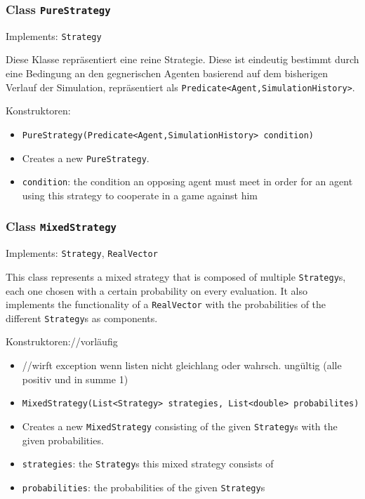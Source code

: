 \documentclass[parskip=full,11pt]{scrartcl}
\begin{document}
\subsubsection{Class \texttt{PureStrategy}}
Implements: \texttt{Strategy}

Diese Klasse repräsentiert eine reine Strategie. Diese ist eindeutig bestimmt durch eine Bedingung an den gegnerischen Agenten basierend auf dem bisherigen Verlauf der Simulation, repräsentiert als \texttt{Predicate<Agent,SimulationHistory>}.

Konstruktoren:
\begin{itemize}\itemsep -10pt
\item \texttt{PureStrategy(Predicate<Agent,SimulationHistory> condition)}
\item[] Creates a new \texttt{PureStrategy}.
\item[] \texttt{condition}: the condition an opposing agent must meet in order for an agent using this strategy to cooperate in a game against him
\end{itemize}

\subsubsection{Class \texttt{MixedStrategy}}
Implements: \texttt{Strategy}, \texttt{RealVector}

This class represents a mixed strategy that is composed of multiple \texttt{Strategy}s, each one chosen with a certain probability on every evaluation. It also implements the functionality of a \texttt{RealVector} with the probabilities of the different \texttt{Strategy}s as components.

Konstruktoren://vorläufig
\begin{itemize}\itemsep -10pt
\item[] //wirft exception wenn listen nicht gleichlang oder wahrsch. ungültig (alle positiv und in summe 1)
\item \texttt{MixedStrategy(List<Strategy> strategies, List<double> probabilites)}
\item[] Creates a new \texttt{MixedStrategy} consisting of the given \texttt{Strategy}s with the given probabilities.
\item[] \texttt{strategies}: the \texttt{Strategy}s this mixed strategy consists of
\item[] \texttt{probabilities}: the probabilities of the given \texttt{Strategy}s
\end{itemize}
\end{document}
